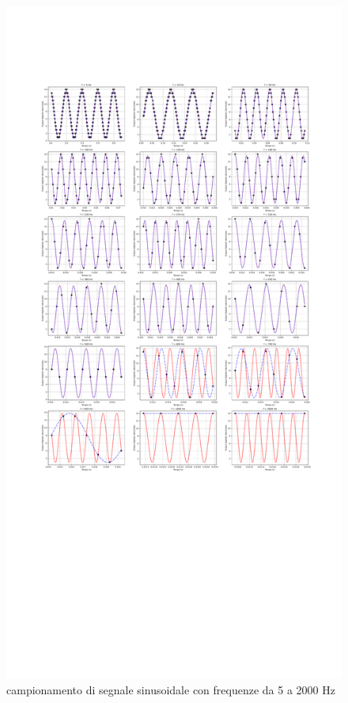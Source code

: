 \documentclass[journal]{IEEEtran}
\begin{document}
\clearpage 
\begin{figure}[t]%
\centering
\includegraphics[trim = {150 0 0 400}, width=1.1\textwidth]{analysis/output/cumulative_nyquist_mcu.pdf}
\caption{campionamento di segnale sinusoidale con frequenze da 5 a 2000 Hz}
\label{fig:nyquist_mcu_cumulative}
\end{figure}
\end{document}
